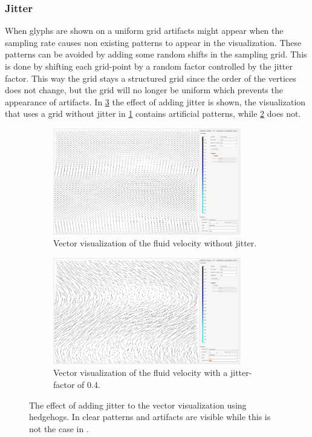 \subsubsection{Jitter} %
\label{ssub:jitter}
When glyphs are shown on a uniform grid artifacts might appear when the sampling rate causes non existing patterns to appear in the visualization. These patterns can be avoided by adding some random shifts in the sampling grid. This is done by shifting each grid-point by a random factor controlled by the jitter factor. This way the grid stays a structured grid since the order of the vertices does not change, but the grid will no longer be uniform which prevents the appearance of artifacts. In \cref{fig:jitter} the effect of adding jitter is shown, the visualization that uses a grid without jitter in \cref{fig:jitter:nojitter} contains artificial patterns, while \cref{fig:jitter:jitter} does not.
\begin{figure}[tbh]
	\centering
	\begin{subfigure}{0.45\textwidth}
		\centering
		\includegraphics[width=0.9\textwidth, trim={35px 30px 430px 30px}, clip]{img/glyphs/nojitter}
		\caption{Vector visualization of the fluid velocity without jitter.}
		\label{fig:jitter:nojitter}
	\end{subfigure}
	\hspace{30px}
	\begin{subfigure}{0.45\textwidth}	
		\centering
		\includegraphics[width=0.9\textwidth, trim={35px 30px 430px 30px}, clip]{img/glyphs/jitter_0.4}
		\caption{Vector visualization of the fluid velocity with a jitter-factor of 0.4.}
		\label{fig:jitter:jitter}
	\end{subfigure}
	\caption{The effect of adding jitter to the vector visualization using hedgehogs. In  clear patterns and artifacts are visible while this is not the case in .}
	\label{fig:jitter}
\end{figure}

